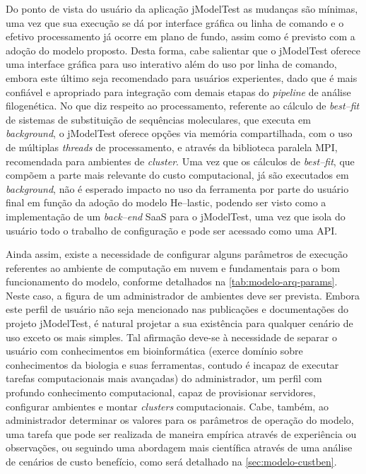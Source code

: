 \documentclass[english,brazilian]{UNISINOSmonografia} %
\begin{document}
Do ponto de vista do usuário da aplicação jModelTest as mudanças são mínimas, uma vez que sua execução se dá por interface gráfica ou linha de comando e o efetivo processamento já ocorre em plano de fundo, assim como é previsto com a adoção do modelo proposto.
Desta forma, cabe salientar que o jModelTest oferece uma interface gráfica para uso interativo além do uso por linha de comando, embora este último seja recomendado para usuários experientes, dado que é mais confiável e apropriado para integração com demais etapas do \textit{pipeline} de análise filogenética.
No que diz respeito ao processamento, referente ao cálculo de \textit{best--fit} de sistemas de substituição de sequências moleculares, que executa em \textit{background}, o jModelTest oferece opções via memória compartilhada, com o uso de múltiplas \textit{threads} de processamento, e através da biblioteca paralela MPI, recomendada para ambientes de \textit{cluster}.
Uma vez que os cálculos de \textit{best--fit}, que compõem a parte mais relevante do custo computacional, já são executados em \textit{background}, não é esperado impacto no uso da ferramenta por parte do usuário final em função da adoção do modelo \textsf{He}--lastic, podendo ser visto como a implementação de um \textit{back--end} SaaS para o jModelTest, uma vez que isola do usuário todo o trabalho de configuração e pode ser acessado como uma API.



Ainda assim, existe a necessidade de configurar alguns parâmetros de execução referentes ao ambiente de computação em nuvem e fundamentais para o bom funcionamento do modelo, conforme detalhados na \autoref{tab:modelo-arq-params}.
Neste caso, a figura de um administrador de ambientes deve ser prevista.
Embora este perfil de usuário não seja mencionado nas publicações e documentações do projeto jModelTest, é natural projetar a sua existência para qualquer cenário de uso exceto os mais simples.
Tal afirmação deve-se à necessidade de separar o usuário com conhecimentos em bioinformática (exerce domínio sobre conhecimentos da biologia e suas ferramentas, contudo é incapaz de executar tarefas computacionais mais avançadas) do administrador, um perfil com profundo conhecimento computacional, capaz de provisionar servidores, configurar ambientes e montar \textit{clusters} computacionais.
%
Cabe, também, ao administrador determinar os valores para os parâmetros de operação do modelo, uma tarefa que pode ser realizada de maneira empírica através de experiência ou observações, ou seguindo uma abordagem mais científica através de uma análise de cenários de custo benefício, como será detalhado na \autoref{sec:modelo-custben}.
\end{document}
